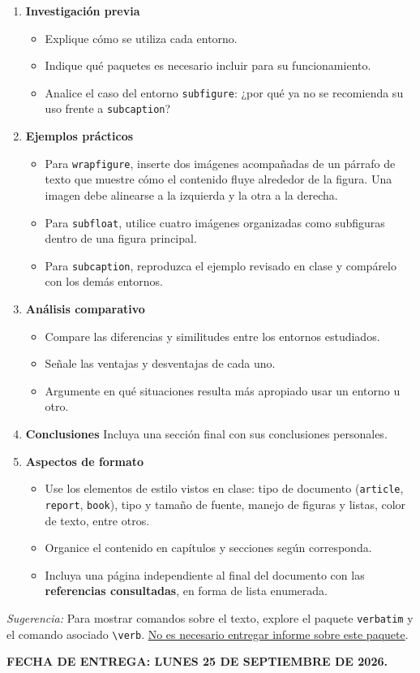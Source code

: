\documentclass{article}
\begin{document}
\begin{enumerate}
    \item \textbf{Investigación previa}
    \begin{itemize}
        \item Explique cómo se utiliza cada entorno.  
        \item Indique qué paquetes es necesario incluir para su funcionamiento.  
        \item Analice el caso del entorno \texttt{subfigure}: ¿por qué ya no se recomienda su uso frente a \texttt{subcaption}?  
    \end{itemize}
    
    \item \textbf{Ejemplos prácticos}
    \begin{itemize}
        \item Para \texttt{wrapfigure}, inserte dos imágenes acompañadas de un párrafo de texto que muestre cómo el contenido fluye alrededor de la figura. Una imagen debe alinearse a la izquierda y la otra a la derecha.  
        \item Para \texttt{subfloat}, utilice cuatro imágenes organizadas como subfiguras dentro de una figura principal.  
        \item Para \texttt{subcaption}, reproduzca el ejemplo revisado en clase y compárelo con los demás entornos.  
    \end{itemize}
    
    \item \textbf{Análisis comparativo}
    \begin{itemize}
        \item Compare las diferencias y similitudes entre los entornos estudiados.  
        \item Señale las ventajas y desventajas de cada uno.  
        \item Argumente en qué situaciones resulta más apropiado usar un entorno u otro.  
    \end{itemize}
    
    \item \textbf{Conclusiones}  
    Incluya una sección final con sus conclusiones personales.  
    
    \item \textbf{Aspectos de formato}
    \begin{itemize}
        \item Use los elementos de estilo vistos en clase: tipo de documento (\texttt{article}, \texttt{report}, \texttt{book}), tipo y tamaño de fuente, manejo de figuras y listas, color de texto, entre otros.  
        \item Organice el contenido en capítulos y secciones según corresponda.  
        \item Incluya una página independiente al final del documento con las \textbf{referencias consultadas}, en forma de lista enumerada.  
    \end{itemize}
\end{enumerate}

\textit{Sugerencia:} Para mostrar comandos sobre el texto, explore el paquete \verb|verbatim| y el comando asociado \verb|\verb|. \underline{No es necesario entregar informe sobre este paquete}.

\vspace{5mm}
\textbf{FECHA DE ENTREGA: LUNES 25 DE SEPTIEMBRE DE 2026.}
\end{document}
